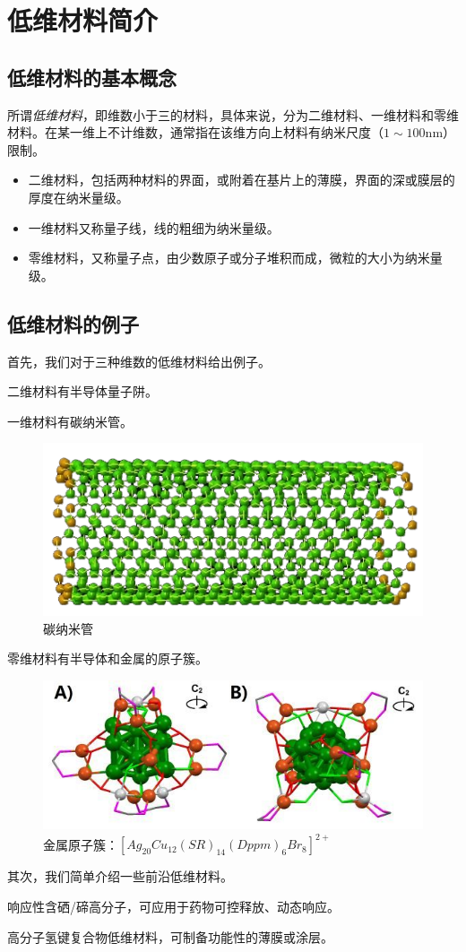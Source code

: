 
\chapter{低维材料简介}

\section{低维材料的基本概念}

所谓\textit{低维材料}，即维数小于三的材料，具体来说，分为二维材料、一维材料和零维材料。在某一维上不计维数，通常指在该维方向上材料有纳米尺度（$1\sim 100\si{\nano\meter}$）限制。

\begin{itemize}
    \item 二维材料，包括两种材料的界面，或附着在基片上的薄膜，界面的深或膜层的厚度在纳米量级。

    \item 一维材料又称量子线，线的粗细为纳米量级。

    \item 零维材料，又称量子点，由少数原子或分子堆积而成，微粒的大小为纳米量级。
\end{itemize}

\section{低维材料的例子}

首先，我们对于三种维数的低维材料给出例子。

二维材料有半导体量子阱。

一维材料有碳纳米管。

\begin{figure}
    \centering
    \includegraphics[scale=0.7]{img/碳纳米管}
    \caption{碳纳米管}
\end{figure}

零维材料有半导体和金属的原子簇。

\begin{figure}
    \centering
    \includegraphics[scale=0.7]{img/金属原子簇}
    \caption{金属原子簇：$[Ag_{20}Cu_{12}(SR)_{14}(Dppm)_6Br_8]^{2+}$}
\end{figure}

其次，我们简单介绍一些前沿低维材料。

响应性含硒/碲高分子，可应用于药物可控释放、动态响应\cite{RN41}。

高分子氢键复合物低维材料，可制备功能性的薄膜或涂层。
